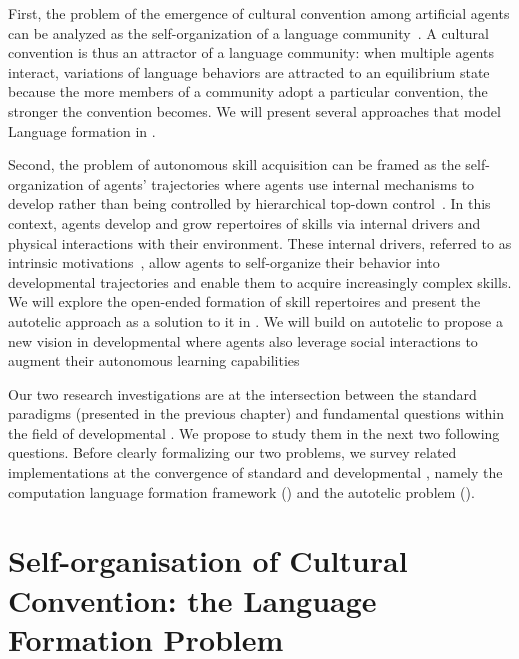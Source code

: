  First, the problem of the emergence of cultural convention among artificial agents can be analyzed as the self-organization of a language community~\citep{steels1995selforganizing,oudeyer2005selforganization}. A cultural convention is thus an attractor of a language community: when multiple agents interact, variations of language behaviors are attracted to an equilibrium state because the more members of a community adopt a particular convention, the stronger the convention becomes. We will present several approaches that model Language formation in . 

Second, the problem of autonomous skill acquisition can be framed as the self-organization of agents' trajectories where agents use internal mechanisms to develop rather than being controlled by hierarchical top-down control~\citep{pfeifer2007robotics}. In this context, agents develop and grow repertoires of skills via internal drivers and physical interactions with their environment. These internal drivers, referred to as intrinsic motivations~\citep{oudeyer2005selforganization}, allow agents to self-organize their behavior into developmental trajectories and enable them to acquire increasingly complex skills. We will explore the open-ended formation of skill repertoires and present the autotelic approach as a solution to it in . We will build on autotelic \rl to propose a new vision in developmental \rl where agents also leverage social interactions to augment their autonomous learning capabilities

Our two research investigations are at the intersection between the standard \ai paradigms (presented in the previous chapter) and fundamental questions within the field of developmental \ai. We propose to study them in the next two following questions. Before clearly formalizing our two problems, we survey related implementations at the convergence of standard and developmental \ai, namely the computation language formation framework () and the autotelic \rl problem ().

\newpage
\section{Self-organisation of Cultural Convention: the Language Formation Problem}
\label{sec:self-orga-lang}

